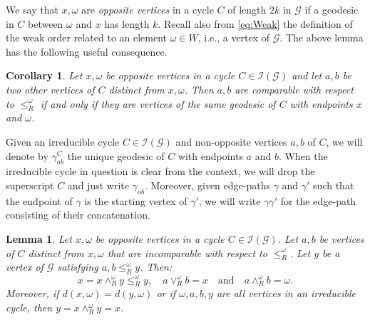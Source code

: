 \documentclass[A4paper, oneside]{amsart}
\newcommand{\Irr}{\mathcal{I}}
\newcommand{\G}{\mathcal{G}}
\newtheorem{cor}[thm]{Corollary}
\newtheorem{lem}[thm]{Lemma}
\theoremstyle{definition}
\begin{document}
We say that $x,\omega$ are {\em opposite vertices} in a cycle $C$ of length $2k$ in $\G$ if a geodesic in $C$ between $\omega$ and $x$ has length $k$. Recall also from \eqref{eq:Weak} the definition of the weak order related to an element  $\omega\in W$, i.e., a vertex of $\G$. The above lemma has the following useful consequence.

\begin{cor}
    Let $x,\omega$ be opposite vertices in a cycle $C \in \Irr(\G)$ and let $a,b$ be two other vertices of $C$ distinct from $x,\omega$. Then $a,b$ are comparable with respect to $\leq_R^{\omega}$ if and only if they are vertices of the same geodesic of $C$ with endpoints $x$ and $\omega$.
\end{cor}

Given an irreducible cycle $C \in \Irr(\G)$ and non-opposite vertices $a,b$ of $C$, we will denote by $\gamma^C_{ab}$ the unique geodesic of $C$ with endpoints $a$ and $b$. When the irreducible cycle in question is clear from the context, we will drop the superscript $C$ and just write $\gamma_{ab}$. Moreover, given edge-paths $\gamma$ and $\gamma'$ such that the endpoint of $\gamma$ is the starting vertex of $\gamma'$, we will write $\gamma\gamma'$ for the edge-path consisting of their concatenation. 


\begin{lem} \label{irr-lemma}  Let $x,\omega$ be opposite vertices in a cycle $C \in \Irr(\G)$. Let $a,b$ be vertices of $C$ distinct from $x,\omega$ that are incomparable with respect to $\leq_R^{\omega}$. Let $y$ be a vertex of $\G$ satisfying $a,b \leq_R^{\omega} y$. Then:
$$
x=x \wedge_R^{\omega} y \leq_R^\omega y,\quad  a\vee_R^{\omega}b= x\quad \text{and}\quad a\wedge_R^{\omega}b= \omega.
$$
Moreover, if $d(x,\omega) = d(y,\omega)$ or if $\omega,a,b,y$ are all vertices in an irreducible cycle, then $y = x \wedge_R^{\omega} y = x$.
\end{lem}
\end{document}
